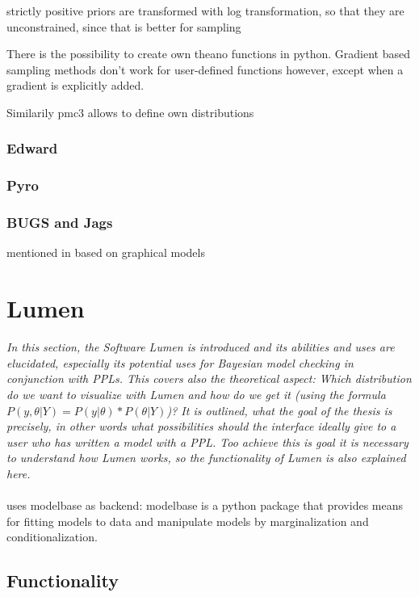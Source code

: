 \documentclass{article}
\begin{document}
strictly positive priors are transformed with log transformation, so that they are unconstrained, since that is better for sampling

There is the possibility to create own theano functions in python. Gradient based sampling methods don't work for user-defined functions however, except when a gradient is explicitly added.

Similarily pmc3 allows to define own distributions
\subsubsection{Edward}

\subsubsection{Pyro}
\subsubsection{BUGS and Jags}
mentioned in \cite{Gelman_2015}
based on graphical models

\section{Lumen}

\textit{In this section, the Software Lumen is introduced and its abilities and uses are elucidated, especially its potential uses for Bayesian model checking in conjunction with PPLs. This covers also the theoretical aspect: Which distribution do we want to visualize with Lumen and how do we get it (using the formula $P(y,\theta|Y) = P(y|\theta) * P(\theta|Y)$)? It is outlined, what the goal of the thesis is precisely, in other words what possibilities should the interface ideally give to a user who has written a model with a PPL. Too achieve this is goal it is necessary to understand how Lumen works, so the functionality of Lumen is also explained here.} 
\\
\\
uses modelbase as backend: modelbase is a python package that provides means for fitting models to data and manipulate models by marginalization and conditionalization.


\subsection{Functionality}
\end{document}
